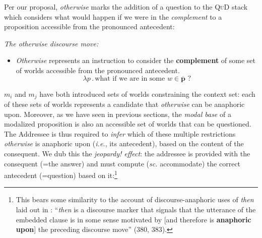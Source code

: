 Per our proposal, \textit{otherwise} marks the addition of a question to the \textsc{QuD} stack which considers what would happen if we were in the \textit{complement} to a proposition accessible from the pronounced antecedent: 

\pex  \label{is-otherwise} \emph{The \emph{otherwise} discourse move:}
\begin{itemize}
	\item [ { \makebox[2em][l]{$ m_k $}} ] \textit{Otherwise} represents an instruction to consider the \textbf{complement} of some set of worlds accessible from the pronounced antecedent. 
	$$\lambda p\,.\,\text{what if we are in some }w\in\overline{\boldsymbol p}\text{ ?}$$
\end{itemize}\xe

$m_i$ and $m_j$ have both introduced sets of worlds constraining the context set: each of these sets of worlds represents a candidate that \textit{otherwise} can be anaphoric upon. Moreover, as we have seen in previous sections, the \textit{modal base} of a modalized proposition is also an accessible set of worlds that can be questioned.
The Addressee is thus required to \textit{infer} which of these multiple restrictions \textit{otherwise} is anaphoric upon (\textit{i.e.}, its antecedent), based on the content of the consequent. We dub this the \textit{jeopardy! effect}: the addressee is provided with the consequent (=the answer) and must compute (\textit{sc.} accommodate) the correct antecedent (=question) based on it:\footnote{This bears some similarity to the account of discourse-anaphoric uses of \textit{then} laid out in \citealt{Biezma2014}: ``\textit{then} is a discourse marker that signals that the utterance of the embedded clause is in some sense motivated by [and therefore is \textbf{anaphoric upon}] the preceding discourse move'' (380, 383).} 

